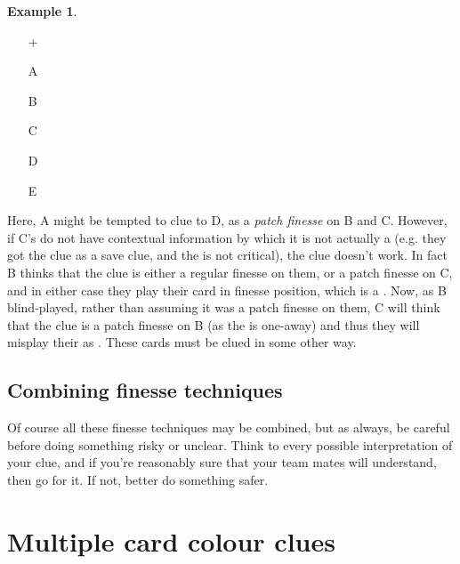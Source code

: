 \documentclass[a4paper]{article}
\theoremstyle{plain}
\theoremstyle{definition}
\newtheorem{example}[theorem]{Example}
\begin{document}
\begin{example}	\hfill \\
	\begin{minipage}{0.45\textwidth}
		\begin{itemize}
			\item[\Large +]      
			\item[\Large A]    
			\item[\Large B]    
			\item[\Large C]     
			\item[\Large D]    
			\item[\Large E]    
		\end{itemize}
	\end{minipage}%
	\begin{minipage}{0.55\textwidth}
		Here, A might be tempted to clue  to D, as a \emph{patch finesse} on B and C. However, if C's  do not have contextual information by which it is not actually a  (e.g. they got the  clue as a save clue, and the  is not critical), the clue doesn't work. In fact B thinks that the clue is either a regular finesse on them, or a patch finesse on C, and in either case they play their card in finesse position, which is a . Now, as B blind-played, rather than assuming it was a patch finesse on them, C will think that the clue is a patch finesse on B (as the  is one-away) and thus they will misplay their  as . These cards must be clued in some other way.
	\end{minipage}
\end{example} \vspace{0.15 cm}

\subsection{Combining finesse techniques}

Of course all these finesse techniques may be combined, but as always, be careful before doing something risky or unclear. Think to every possible interpretation of your clue, and if you're reasonably sure that your team mates will understand, then go for it. If not, better do something safer.


\section{Multiple card colour clues}
\end{document}
